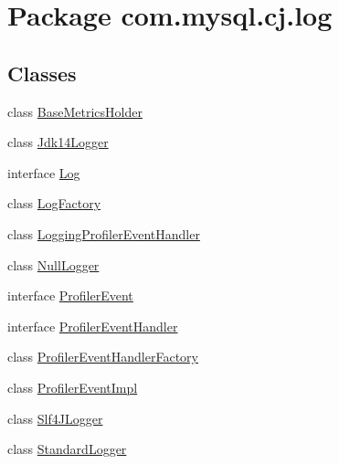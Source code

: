 \hypertarget{namespacecom_1_1mysql_1_1cj_1_1log}{}\section{Package com.\+mysql.\+cj.\+log}
\label{namespacecom_1_1mysql_1_1cj_1_1log}
\subsection*{Classes}
\begin{DoxyCompactItemize}
\item 
class \mbox{\hyperlink{classcom_1_1mysql_1_1cj_1_1log_1_1_base_metrics_holder}{Base\+Metrics\+Holder}}
\item 
class \mbox{\hyperlink{classcom_1_1mysql_1_1cj_1_1log_1_1_jdk14_logger}{Jdk14\+Logger}}
\item 
interface \mbox{\hyperlink{interfacecom_1_1mysql_1_1cj_1_1log_1_1_log}{Log}}
\item 
class \mbox{\hyperlink{classcom_1_1mysql_1_1cj_1_1log_1_1_log_factory}{Log\+Factory}}
\item 
class \mbox{\hyperlink{classcom_1_1mysql_1_1cj_1_1log_1_1_logging_profiler_event_handler}{Logging\+Profiler\+Event\+Handler}}
\item 
class \mbox{\hyperlink{classcom_1_1mysql_1_1cj_1_1log_1_1_null_logger}{Null\+Logger}}
\item 
interface \mbox{\hyperlink{interfacecom_1_1mysql_1_1cj_1_1log_1_1_profiler_event}{Profiler\+Event}}
\item 
interface \mbox{\hyperlink{interfacecom_1_1mysql_1_1cj_1_1log_1_1_profiler_event_handler}{Profiler\+Event\+Handler}}
\item 
class \mbox{\hyperlink{classcom_1_1mysql_1_1cj_1_1log_1_1_profiler_event_handler_factory}{Profiler\+Event\+Handler\+Factory}}
\item 
class \mbox{\hyperlink{classcom_1_1mysql_1_1cj_1_1log_1_1_profiler_event_impl}{Profiler\+Event\+Impl}}
\item 
class \mbox{\hyperlink{classcom_1_1mysql_1_1cj_1_1log_1_1_slf4_j_logger}{Slf4\+J\+Logger}}
\item 
class \mbox{\hyperlink{classcom_1_1mysql_1_1cj_1_1log_1_1_standard_logger}{Standard\+Logger}}
\end{DoxyCompactItemize}
